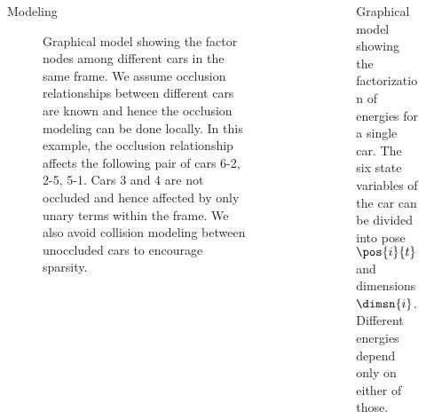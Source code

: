 \documentclass[final]{beamer}
\newlength{\sepwid}
\newlength{\onecolwid}
\begin{document}
\begin{frame}[t]
\begin{columns}[t]
\begin{column}{\onecolwid}
\begin{block}{Modeling}
        \begin{figure}
          \centering
          \caption{Graphical model showing the factor nodes among different
            cars in the same frame. We assume occlusion relationships between
            different cars are known and hence the occlusion modeling can be done
            locally. In this example, the occlusion relationship affects the
            following pair of cars 6-2, 2-5, 5-1. Cars 3 and 4 are not occluded
            and hence affected by only unary terms within the frame. We also avoid 
            collision modeling between unoccluded cars to encourage sparsity.
          }
          \label{fig:graphmodel}
        \end{figure}

      \end{block}
    \end{column}

  \begin{column}{\sepwid}\end{column}			%

      
    \begin{column}{\onecolwid}
        \begin{figure}
          \centering
          
          \caption{Graphical model showing the factorization of energies for a
            single car. The six state variables of the car can be divided into
            pose $\pos{i}{t}$ and dimensions $\dimsn{i}$. Different energies
          depend only on either of those.}
        \end{figure}


\end{column}
\end{columns}
\end{frame}
\end{document}
